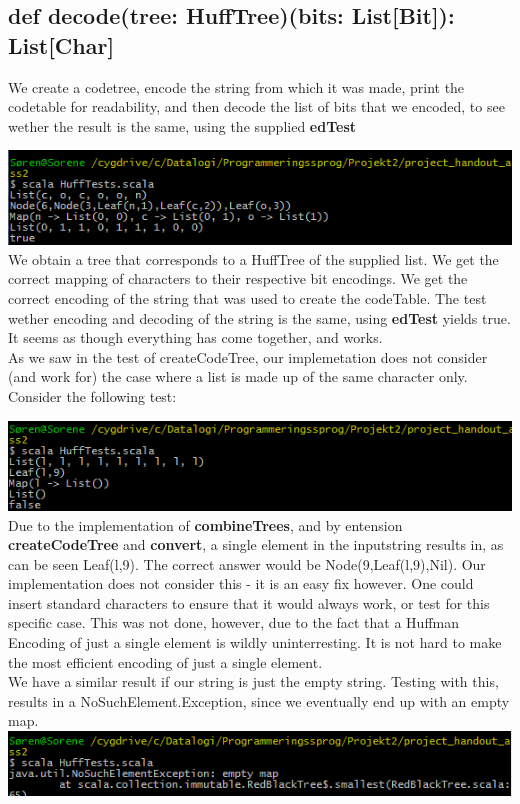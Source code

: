 \documentclass{article}
\begin{document}
\subsection{def decode(tree: HuffTree)(bits: List[Bit]): List[Char]}
We create a codetree, encode the string from which it was made, print the codetable for readability, and then decode the list of bits that we encoded, to see wether the result is the same, using the supplied \textbf{edTest}

\includegraphics{test10.png}
We obtain a tree that corresponds to a HuffTree of the supplied list. We get the correct mapping of characters to their respective bit encodings. We get the correct encoding of the string that was used to create the codeTable. The test wether encoding and decoding of the string is the same, using \textbf{edTest} yields true. It seems as though everything has come together, and works. 
\newline
\\
As we saw in the test of createCodeTree, our implemetation does not consider (and work for) the case where a list is made up of the same character only. Consider the following test: 

\includegraphics{test11.png}
Due to the implementation of \textbf{combineTrees},  and by entension \textbf{createCodeTree} and \textbf{convert}, a single element in the inputstring results in, as can be seen Leaf(l,9). The correct answer would be Node(9,Leaf(l,9),Nil). Our implementation does not consider this - it is an easy fix however. One could insert standard characters to ensure that it would always work, or test for this specific case. This was not done, however, due to the fact that a Huffman Encoding of just a single element is wildly uninterresting. It is not hard to make the most efficient encoding of just a single element. 
\newline
\\
We have a similar result if our string is just the empty string. Testing with this, results in a NoSuchElement.Exception, since we eventually end up with an empty map. 
\newline
\includegraphics{testempty.png}
\end{document}
